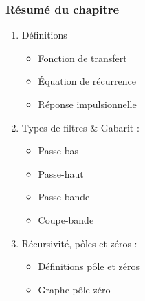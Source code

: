 \documentclass{beamer}
\begin{document}
\begin{frame}
\frametitle{Résumé du chapitre}
\begin{enumerate}
\item Définitions
\begin{itemize}
\item Fonction de transfert 
\vspace{0.1cm}
\item \'Equation de récurrence
\vspace{0.1cm}
\item Réponse impulsionnelle
\vspace{0.1cm}
\end{itemize}
\vspace{0.2cm} 
\item Types de filtres \& Gabarit  :
\begin{itemize}
\item Passe-bas
\vspace{0.1cm}
\item Passe-haut
\vspace{0.1cm}
\item Passe-bande
\vspace{0.1cm}
\item Coupe-bande
\end{itemize}
\vspace{0.2cm} 
\item Récursivité, pôles et zéros :
\begin{itemize}
\item Définitions pôle et zéros
\vspace{0.1cm}
\item Graphe pôle-zéro
\end{itemize}
\vspace{0.2cm} 

\end{enumerate}
\end{frame}
\end{document}
